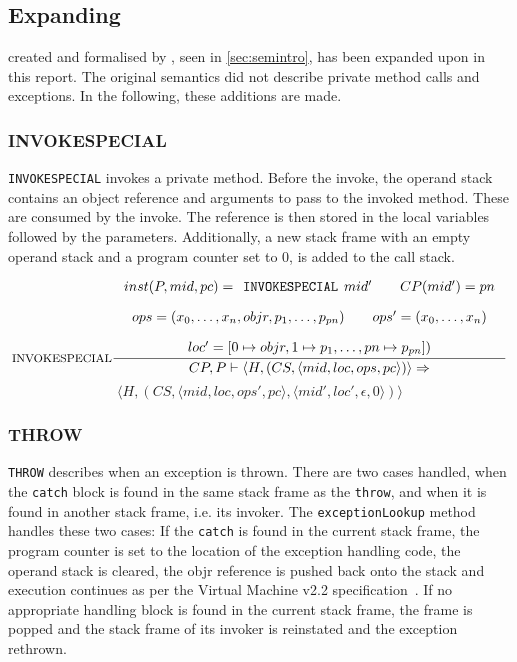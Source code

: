 \subsection{Expanding \jcl}
\jcl created and formalised by \cite{javasec}, seen in \cref{sec:semintro}, has been expanded upon in this report. The original semantics did not describe private method calls and exceptions. In the following, these additions are made.

\subsubsection{INVOKESPECIAL}
\texttt{INVOKESPECIAL} invokes a private method. Before the invoke, the operand stack contains an object reference and arguments to pass to the invoked method. These are consumed by the invoke. The reference is then stored in the local variables followed by the parameters. Additionally, a new stack frame with an empty operand stack and a program counter set to $0$, is added to the call stack. 

$$\inference[INVOKESPECIAL]{
inst(P,mid,pc) = \texttt{INVOKESPECIAL }mid' \semsp 
CP(mid') = pn \semnl \\
ops = (x_0, \ldots, x_n, objr, p_1, \ldots, p_{pn}) \semsp
ops' = (x_0, \ldots, x_{n}) \semnl\\
loc' = [0 \mapsto objr, 1 \mapsto p_{1}, \ldots, pn \mapsto p_{pn}])}
{CP, P \vdash \langle H, (CS, \langle mid, loc, ops, pc \rangle)\rangle \Rightarrow }$$
$$\langle H, (CS, \langle mid, loc, ops', pc \rangle, \langle mid', loc', \epsilon, 0 \rangle)\rangle$$


\subsubsection{THROW}
\texttt{THROW} describes when an exception is thrown. There are two cases handled, when the \texttt{catch} block is found in the same stack frame as the \texttt{throw}, and when it is found in another stack frame, i.e. its invoker. The \texttt{exceptionLookup} method handles these two cases: If the \texttt{catch} is found in the current stack frame, the program counter is set to the location of the exception handling code, the operand stack is cleared, the objr reference is pushed back onto the stack and execution continues as per the \jc Virtual Machine v2.2 specification~\cite[JcvmSpec p. 151]{jcvm}. If no appropriate handling block is found in the current stack frame, the frame is popped and the stack frame of its invoker is reinstated and the exception rethrown.\vspace{10px}

